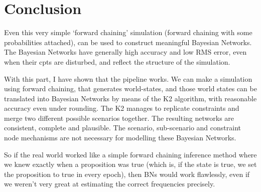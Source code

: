 \section{Conclusion}
Even this very simple `forward chaining' simulation (forward chaining with some probabilities attached), can be used to construct meaningful Bayesian Networks. The Bayesian Networks have generally high accuracy and low RMS error, even when their cpts are disturbed, and reflect the structure of the simulation. 

With this part, I have shown that the pipeline works. We can make a simulation using forward chaining, that generates world-states, and those world states can be translated into Bayesian Networks by means of the K2 algorithm, with reasonable accuracy even under rounding. The K2 manages to replicate constraints and merge two different possible scenarios together. The resulting networks are consistent, complete and plausible. The scenario, sub-scenario and constraint node mechanisms are not necessary for modelling these Bayesian Networks.

So if the real world worked like a simple forward chaining inference method where we knew exactly when a proposition was true (which is, if the state is true, we set the proposition to true in every epoch), then BNs would work flawlessly, even if we weren't very great at estimating the correct frequencies precisely.






